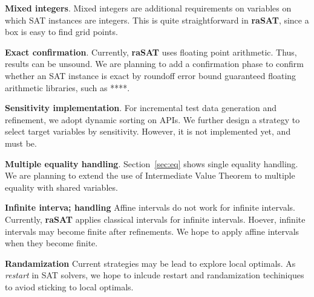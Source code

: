 \documentclass[runningheads,a4paper,oribibl]{llncs}
\begin{document}
\medskip \noindent 
{\bf Mixed integers}. 
Mixed integers are additional requirements on variables on which SAT instances are integers. 
This is quite straightforward in {\bf raSAT}, since a box is easy to find grid points. 

\medskip \noindent 
{\bf Exact confirmation}.
Currently, {\bf raSAT} uses floating point arithmetic. Thus, results can be unsound. 
We are planning to add a confirmation phase to confirm whether an SAT instance is exact
by roundoff error bound guaranteed floating arithmetic libraries, such as ****. 


\medskip \noindent 
{\bf Sensitivity implementation}. 
For incremental test data generation and refinement, we adopt dynamic sorting on APIs. 
We further design a strategy to select target variables by sensitivity. 
However, it is not implemented yet, and must be. 

\medskip \noindent 
{\bf Multiple equality handling}. 
Section~\ref{sec:eq} shows single equality handling. 
We are planning to extend the use of Intermediate Value Theorem to multiple equality with 
shared variables. 

\medskip \noindent 
{\bf Infinite interva; handling}
Affine intervals do not work for infinite intervals. 
Currently, {\bf raSAT} applies classical intervals for infinite intervals. 
Hoever, infinite intervals may become finite after refinements. 
We hope to apply affine intervals when they become finite. 

\medskip \noindent 
{\bf Randamization}
Current strategies may be lead to explore local optimals. 
As {\em restart} in SAT solvers, we hope to inlcude restart and randamization techiniques 
to aviod sticking to local optimals. 
\end{document}
